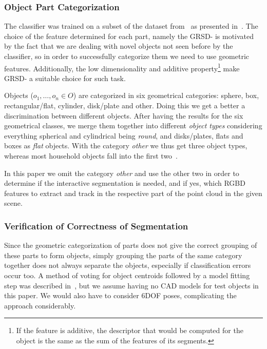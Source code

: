 
\subsubsection{Object Part Categorization}
\label{sec:part-feature}
The classifier was trained on a subset of the dataset from~\cite{lai11db} 
as presented in~\cite{marton12SC}.
The choice of the feature determined for each part, namely the GRSD- is motivated 
by the fact that we are dealing with novel objects not seen before 
by the classifier, so in order to successfully categorize them we need to use geometric features.
Additionally, the low dimensionality and additive property\footnote{If the feature is additive,
the descriptor that would be computed for the object is the same as the sum of the features of its segments.} make GRSD- a suitable choice for such task.

Objects ($o_{1}, \dots, o_{n} \in O$) are categorized in six geometrical categories: sphere, box, rectangular/flat, cylinder, disk/plate and other.
Doing this we get a better a discrimination between different objects. After having the results for the 
six geometrical classes, we merge them together into different \emph{object types} considering everything spherical and cylindrical being
\emph{round}, and disks/plates, flats and boxes as \emph{flat} objects.
With the category \emph{other} we thus get three object types, whereas most
household objects fall into the first two~\cite{marton11ijrr}.

In this paper we omit the category \emph{other} and use the other two in order
to determine if the interactive segmentation is needed, and if yes, which RGBD features 
to extract and track in the respective part of the point cloud in the given scene.

\subsubsection{Verification of Correctness of Segmentation}
\label{sec:probabilities}	
Since the geometric categorization of parts does not give the correct grouping of these parts to form objects,
simply grouping the parts of the same category together does not always separate the objects, especially if classification errors occur too.
A method of voting for object centroids followed by a model fitting step was described in~\cite{mozos11furniture},
but we assume having no CAD models for test objects in this paper. We would also have to consider 6DOF poses, complicating the approach considerably.

